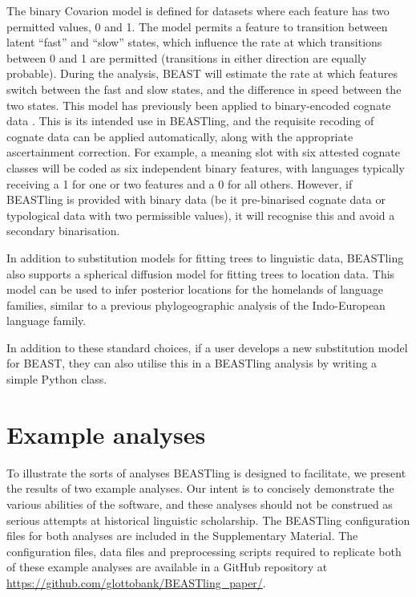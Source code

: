 \documentclass[twocolumn,10pt]{scrartcl}
\begin{document}
The binary Covarion model\cite{Penny2001} is defined for datasets where each feature has two permitted values, 0 and 1.  The model permits a feature to transition between latent ``fast'' and ``slow'' states, which influence the rate at which transitions between 0 and 1 are permitted (transitions in either direction are equally probable).  During the analysis, BEAST will estimate the rate at which features switch between the fast and slow states, and the difference in speed between the two states.  This model has previously been applied to binary-encoded cognate data \cite{Gray2009,Bouckaert2012}.  This is its intended use in BEASTling, and the requisite recoding of cognate data can be applied automatically, along with the appropriate ascertainment correction.  For example, a meaning slot with six attested cognate classes will be coded as six independent binary features, with languages typically receiving a 1 for one or two features and a 0 for all others.  However, if BEASTling is provided with binary data (be it pre-binarised cognate data or typological data with two permissible values), it will recognise this and avoid a secondary binarisation.

In addition to substitution models for fitting trees to linguistic data, BEASTling also supports a spherical diffusion model\cite{Bouckaert2016} for fitting trees to location data.  This model can be used to infer posterior locations for the homelands of language families, similar to a previous phylogeographic analysis of the Indo-European language family\cite{Bouckaert2012}.

In addition to these standard choices, if a user develops a new substitution model for BEAST, they can also utilise this in a BEASTling analysis by writing a simple Python class.

\section{Example analyses}

To illustrate the sorts of analyses BEASTling is designed to facilitate, we present the results of two example analyses.  Our intent is to concisely demonstrate the various abilities of the software, and these analyses should not be construed as serious attempts at historical linguistic scholarship.  The BEASTling configuration files for both analyses are included in the Supplementary Material.  The configuration files, data files and preprocessing scripts required to replicate both of these example analyses are available in a GitHub repository at \url{https://github.com/glottobank/BEASTling_paper/}.
\end{document}
